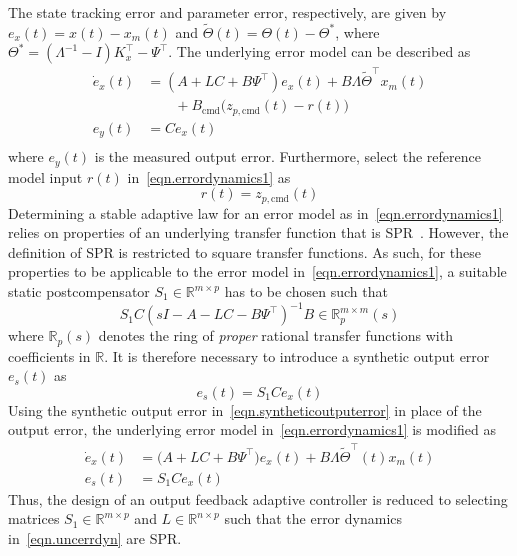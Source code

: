 \documentclass[journal]{IEEEtran}
\theoremstyle{innercustomthm}
\begin{document}
  The state tracking error and parameter error, respectively, are given by $e_{x}(t) = x(t) - x_{m}(t)$ and $\widetilde{\Theta}(t) = \Theta(t) - \Theta^{*}$, where $\Theta^{*}=(\Lambda^{-1}-I)K_{x}^{\top}-\Psi^{\top}$.
  The underlying error model can be described as
  {%
    \small
    \begin{equation}
      \label{eqn.errordynamics1}
      \begin{split}
        \dot{e}_{x}(t) &= (A+LC+B\Psi^{\top})e_{x}(t) + B\Lambda\widetilde{\Theta}^{\top}x_{m}(t) \\
        & \qquad + B_{\text{cmd}}\bigr(z_{p,\text{cmd}}(t) - r(t)\bigr) \\
        e_{y}(t) &= Ce_{x}(t) \\
      \end{split}
    \end{equation}
  }%
  where $e_{y}(t)$ is the measured output error.
  Furthermore, select the reference model input $r(t)$ in\ \eqref{eqn.errordynamics1} as
  \begin{equation}
    \label{eqn.zcmd1}
    r(t) = z_{p,\text{cmd}}(t)
  \end{equation}
  Determining a stable adaptive law for an error model as in\ \eqref{eqn.errordynamics1} relies on properties of an underlying transfer function that is SPR\ \cite{narendra.stable.2005}.
  However, the definition of SPR is restricted to square transfer functions.
  As such, for these properties to be applicable to the error model in\ \eqref{eqn.errordynamics1}, a suitable static postcompensator $S_1\in\mathbb{R}^{m\times p}$ has to be chosen such that
  \begin{equation*}
    S_{1}C(sI-A-LC-B\Psi^{\top})^{-1}B \in\mathbb{R}_{p}^{m\times m}(s)
  \end{equation*}
  where $\mathbb{R}_{p}(s)$ denotes the ring of \textit{proper} rational transfer functions with coefficients in $\mathbb{R}$.
  It is therefore necessary to introduce a synthetic output error $e_{s}(t)$ as
  \begin{equation}
    \label{eqn.syntheticoutputerror}
    e_{s}(t) = S_{1}Ce_{x}(t)
  \end{equation}
  Using the synthetic output error in\ \eqref{eqn.syntheticoutputerror} in place of the output error, the underlying error model in\ \eqref{eqn.errordynamics1} is modified as
  {%
    \small
    \begin{equation}
      \label{eqn.uncerrdyn}
      \begin{split}
        \dot{e}_{x}(t) &= \bigr(A+LC+B\Psi^{\top}\bigr)e_{x}(t) + B\Lambda\widetilde{\Theta}^{\top}(t)x_{m}(t) \\
        e_{s}(t) &= S_{1}Ce_{x}(t)
      \end{split}
    \end{equation}
  }%
  Thus, the design of an output feedback adaptive controller is reduced to selecting matrices $S_{1}\in\mathbb{R}^{m\times p}$ and $L\in\mathbb{R}^{n\times p}$ such that the error dynamics in\ \eqref{eqn.uncerrdyn} are SPR.\@
\end{document}
